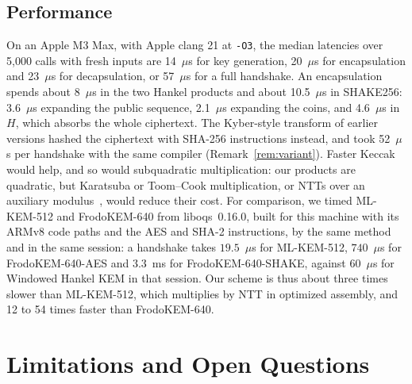 \documentclass[11pt,a4paper]{article}
\theoremstyle{definition}
\begin{document}
\subsection{Performance}
On an Apple M3 Max, with Apple clang 21 at \texttt{-O3}, the median latencies over 5{,}000 calls with fresh inputs are 14~$\mu$s for key generation, 20~$\mu$s for encapsulation and 23~$\mu$s for decapsulation, or 57~$\mu$s for a full handshake. An encapsulation spends about 8~$\mu$s in the two Hankel products and about 10.5~$\mu$s in SHAKE256: 3.6~$\mu$s expanding the public sequence, 2.1~$\mu$s expanding the coins, and 4.6~$\mu$s in $H$, which absorbs the whole ciphertext. The Kyber-style transform of earlier versions hashed the ciphertext with SHA-256 instructions instead, and took 52~$\mu$s per handshake with the same compiler (Remark~\ref{rem:variant}). Faster Keccak would help, and so would subquadratic multiplication: our products are quadratic, but Karatsuba or Toom--Cook multiplication, or NTTs over an auxiliary modulus~\cite{chung2021ntt}, would reduce their cost. For comparison, we timed ML-KEM-512 and FrodoKEM-640 from liboqs~0.16.0, built for this machine with its ARMv8 code paths and the AES and SHA-2 instructions, by the same method and in the same session: a handshake takes $19.5$~$\mu$s for ML-KEM-512, $740$~$\mu$s for FrodoKEM-640-AES and $3.3$~ms for FrodoKEM-640-SHAKE, against $60$~$\mu$s for Windowed Hankel KEM in that session. Our scheme is thus about three times slower than ML-KEM-512, which multiplies by NTT in optimized assembly, and 12 to 54 times faster than FrodoKEM-640.

\section{Limitations and Open Questions}\label{sec:limitations}
\end{document}
